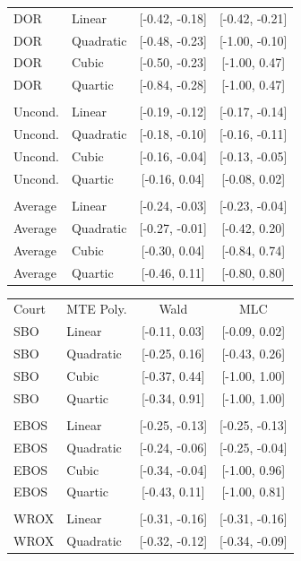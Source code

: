 \documentclass[11pt]{article}
\theoremstyle{definition}
\newcommand{\0}{\ensuremath{\mathbf{0}}}
\begin{document}
\begin{bibunit}
\begin{table}[htbp]
\begin{tabular}{llcc}
    DOR   & Linear  & [-0.42, -0.18] & [-0.42, -0.21] \\
    DOR   & Quadratic  & [-0.48, -0.23] & [-1.00, -0.10] \\
    DOR   & Cubic  & [-0.50, -0.23] & [-1.00, 0.47] \\
    DOR   & Quartic  & [-0.84, -0.28] & [-1.00, 0.47] \\
          &       &       &  \\
    Uncond.  & Linear  & [-0.19, -0.12] & [-0.17, -0.14] \\
    Uncond.  & Quadratic  & [-0.18, -0.10] & [-0.16, -0.11] \\
    Uncond.  & Cubic  & [-0.16, -0.04] & [-0.13, -0.05] \\
    Uncond.  & Quartic  & [-0.16, 0.04] & [-0.08, 0.02] \\
          &       &       &  \\
    Average & Linear  & [-0.24, -0.03] & [-0.23, -0.04] \\
    Average & Quadratic  & [-0.27, -0.01] & [-0.42, 0.20] \\
    Average & Cubic  & [-0.30, 0.04] & [-0.84, 0.74] \\
    Average & Quartic  & [-0.46, 0.11] & [-0.80, 0.80] \\
    \bottomrule
    \end{tabular}%
		\quad
    \begin{tabular}{llcc}
		\toprule
    Court & MTE Poly. & Wald  & MLC \\
    SBO   & Linear  & [-0.11, 0.03] & [-0.09, 0.02] \\
    SBO   & Quadratic  & [-0.25, 0.16] & [-0.43, 0.26] \\
    SBO   & Cubic  & [-0.37, 0.44] & [-1.00, 1.00] \\
    SBO   & Quartic  & [-0.34, 0.91] & [-1.00, 1.00] \\
          &       &       &  \\
    EBOS  & Linear  & [-0.25, -0.13] & [-0.25, -0.13] \\
    EBOS  & Quadratic  & [-0.24, -0.06] & [-0.25, -0.04] \\
    EBOS  & Cubic  & [-0.34, -0.04] & [-1.00, 0.96] \\
    EBOS  & Quartic  & [-0.43, 0.11] & [-1.00, 0.81] \\
          &       &       &  \\
    WROX  & Linear  & [-0.31, -0.16] & [-0.31, -0.16] \\
    WROX  & Quadratic  & [-0.32, -0.12] & [-0.34, -0.09] \\

\end{tabular}
\end{table}
\end{bibunit}
\end{document}
